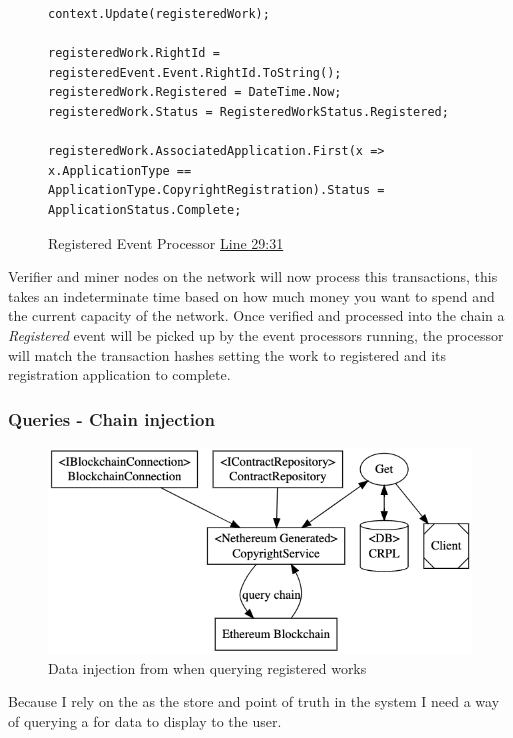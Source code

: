 \begin{figure}[H]
\caption{Registered Event Processor \href{https://github.com/MrHarrisonBarker/CRPL/blob/main/CRPL.Web/Core/EventProcessors/RegisteredEventProcessor.cs}{Line 29:31}}
\centering
\begin{lstlisting}[language=CSharp]
context.Update(registeredWork);

registeredWork.RightId = registeredEvent.Event.RightId.ToString();
registeredWork.Registered = DateTime.Now;
registeredWork.Status = RegisteredWorkStatus.Registered;

registeredWork.AssociatedApplication.First(x => x.ApplicationType == ApplicationType.CopyrightRegistration).Status = ApplicationStatus.Complete;	
\end{lstlisting}
\end{figure}

Verifier and miner nodes on the network will now process this transactions, this takes an indeterminate time based on how much money you want to spend and the current capacity of the network. Once verified and processed into the chain a \textit{Registered} event will be picked up by the event processors running, the processor will match the transaction hashes setting the work to registered and its registration application to complete.

\subsubsection{Queries - Chain injection}

\begin{figure}[H]
\caption{Data injection from  when querying registered works}
\centering
\includegraphics[width=\textwidth,height=\textheight,keepaspectratio]{images/operational/chain-inject}
\end{figure}

Because I rely on the  as the store and point of truth in the system I need a way of querying a  for data to display to the user. 

